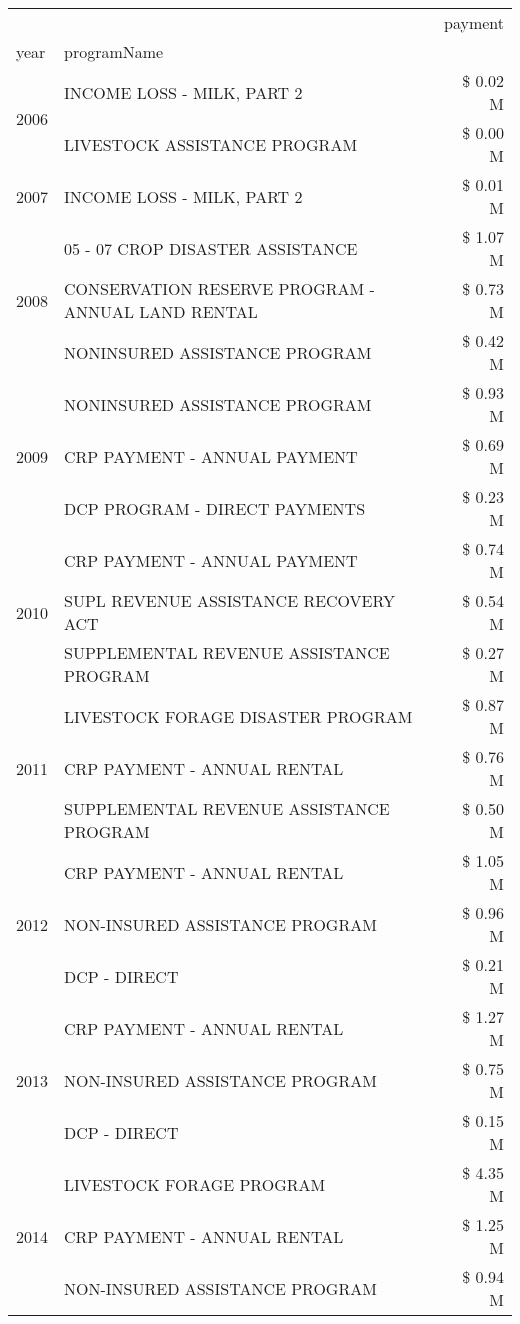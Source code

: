 \begin{tabular}{llr}
\toprule
 &  & payment \\
year & programName &  \\
\midrule
\multirow[t]{2}{*}{2006} & INCOME LOSS - MILK, PART 2 & \$ 0.02 M \\
 & LIVESTOCK ASSISTANCE PROGRAM & \$ 0.00 M \\
\cline{1-3}
2007 & INCOME LOSS - MILK, PART 2 & \$ 0.01 M \\
\cline{1-3}
\multirow[t]{3}{*}{2008} & 05 - 07 CROP DISASTER ASSISTANCE & \$ 1.07 M \\
 & CONSERVATION RESERVE PROGRAM - ANNUAL LAND RENTAL & \$ 0.73 M \\
 & NONINSURED ASSISTANCE PROGRAM & \$ 0.42 M \\
\cline{1-3}
\multirow[t]{3}{*}{2009} & NONINSURED ASSISTANCE PROGRAM & \$ 0.93 M \\
 & CRP PAYMENT - ANNUAL PAYMENT & \$ 0.69 M \\
 & DCP PROGRAM - DIRECT PAYMENTS & \$ 0.23 M \\
\cline{1-3}
\multirow[t]{3}{*}{2010} & CRP PAYMENT - ANNUAL PAYMENT & \$ 0.74 M \\
 & SUPL REVENUE ASSISTANCE RECOVERY ACT & \$ 0.54 M \\
 & SUPPLEMENTAL REVENUE ASSISTANCE PROGRAM & \$ 0.27 M \\
\cline{1-3}
\multirow[t]{3}{*}{2011} & LIVESTOCK FORAGE DISASTER PROGRAM & \$ 0.87 M \\
 & CRP PAYMENT - ANNUAL RENTAL & \$ 0.76 M \\
 & SUPPLEMENTAL REVENUE ASSISTANCE PROGRAM & \$ 0.50 M \\
\cline{1-3}
\multirow[t]{3}{*}{2012} & CRP PAYMENT - ANNUAL RENTAL & \$ 1.05 M \\
 & NON-INSURED ASSISTANCE PROGRAM & \$ 0.96 M \\
 & DCP - DIRECT & \$ 0.21 M \\
\cline{1-3}
\multirow[t]{3}{*}{2013} & CRP PAYMENT - ANNUAL RENTAL & \$ 1.27 M \\
 & NON-INSURED ASSISTANCE PROGRAM & \$ 0.75 M \\
 & DCP - DIRECT & \$ 0.15 M \\
\cline{1-3}
\multirow[t]{3}{*}{2014} & LIVESTOCK FORAGE PROGRAM & \$ 4.35 M \\
 & CRP PAYMENT - ANNUAL RENTAL & \$ 1.25 M \\
 & NON-INSURED ASSISTANCE PROGRAM & \$ 0.94 M \\

\end{tabular}
